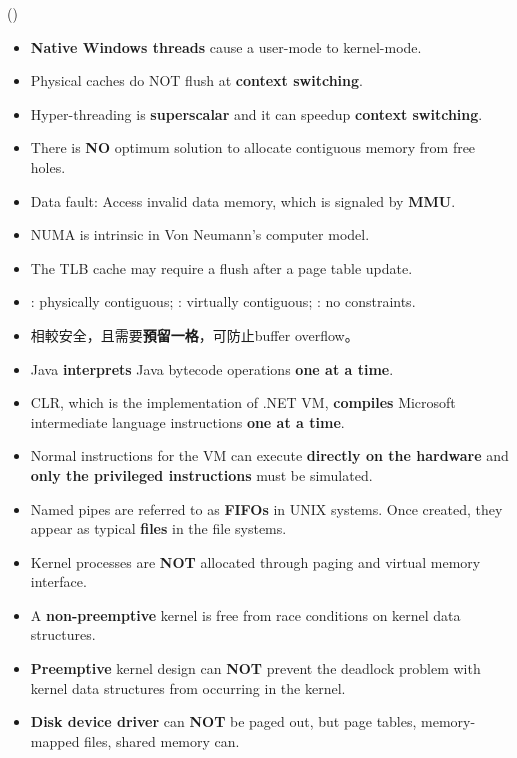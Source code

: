 \begin{theorem}{()} \quad\quad \begin{itemize}
        \item \textbf{Native Windows threads} cause a user-mode to kernel-mode.
        \item Physical caches do NOT flush at \textbf{context switching}.
        \item Hyper-threading is \textbf{superscalar} and it can speedup \textbf{context switching}.
        \item There is \textbf{NO} optimum solution to allocate contiguous memory from free holes.
        \item Data fault: Access invalid data memory, which is signaled by \textbf{MMU}.
        \item NUMA is intrinsic in Von Neumann's computer model.
        \item The TLB cache may require a flush after a page table update.
        \item {}: physically contiguous; : virtually contiguous; : no constraints.
        \item {}相較安全，且需要\textbf{預留一格}，可防止buffer overflow。
        \item Java \textbf{interprets} Java bytecode operations \textbf{one at a time}.
        \item CLR, which is the implementation of .NET VM, \textbf{compiles} Microsoft intermediate language instructions \textbf{one at a time}.
        \item Normal instructions for the VM can execute \textbf{directly on the hardware} and \textbf{only the privileged instructions} must be simulated.
        \item Named pipes are referred to as \textbf{FIFOs} in UNIX systems. Once created, they appear as typical \textbf{files} in the file systems. 
        \item Kernel processes are \textbf{NOT} allocated through paging and virtual memory interface.
        \item A \textbf{non-preemptive} kernel is free from race conditions on kernel data structures.
        \item \textbf{Preemptive} kernel design can \textbf{NOT} prevent the deadlock problem with kernel data structures from occurring in the kernel.
        \item \textbf{Disk device driver} can \textbf{NOT} be paged out, but page tables, memory-mapped files, shared memory can.

\end{itemize}
\end{theorem}

